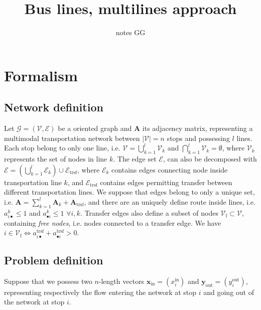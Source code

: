 \documentclass[11p]{article}
\title{Bus lines, multilines approach}
\author{notes GG}
\begin{document}
\maketitle

\section{Formalism}

\subsection{Network definition}

Let $\mathcal{G} = (\mathcal{V}, \mathcal{E})$ be a oriented graph and $\mathbf{A}$ its adjacency matrix, representing a multimodal transportation network between $|\mathcal{V}| = n$ stops and possessing $l$ lines. Each stop belong to only one line, i.e. $\mathcal{V} = \bigcup_{k=1}^l \mathcal{V}_k$ and $\bigcap_{k=1}^l \mathcal{V}_k = \emptyset$, where $\mathcal{V}_k$ represents the set of nodes in line $k$. The edge set $\mathcal{E}$, can also be decomposed with $\mathcal{E} = \left(\bigcup_{k=1}^l \mathcal{E}_k\right) \cup \mathcal{E}_\text{trsf}$, where $\mathcal{E}_k$ contains edges connecting node inside transportation line $k$, and $\mathcal{E}_\text{trsf}$ contains edges permitting transfer between different transportation lines. We suppose that edges belong to only a unique set, i.e. $\mathbf{A} = \sum_{k=1}^l \mathbf{A}_k + \mathbf{A}_\text{trsf}$, and there are an uniquely define route inside lines, i.e. $a^k_{i \bullet} \leq 1$ and $a^k_{\bullet i} \leq 1$ $\forall i,k$. Transfer edges also define a subset of nodes $\mathcal{V}_\text{f} \subset \mathcal{V}$, containing \emph{free nodes}, i.e. nodes connected to a transfer edge. We have $i \in \mathcal{V}_\text{f} \iff a^\text{trsf}_{i \bullet} + a^\text{trsf}_{\bullet i} > 0$.

\subsection{Problem definition}

Suppose that we possess two $n$-length vectors $\mathbf{x}_\text{in} = (x^\text{in}_i)$ and $\mathbf{y}_\text{out} = (y^\text{out}_i)$, representing respectively the flow entering the network at stop $i$ and going out of the network at stop $i$. 
\end{document}
